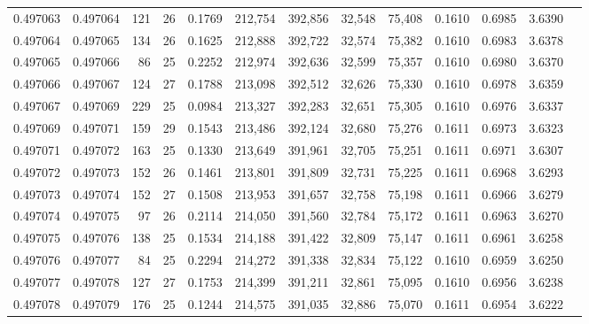 \begin{tabular}{rrrrrrrrrrrrr}
0.497063 & 0.497064 & 121 &  26 &                                     0.1769 & 212,754 & 392,856 &  32,548 &  75,408 & 0.1610 & 0.6985 & 3.6390 \\
0.497064 & 0.497065 & 134 &  26 &                                     0.1625 & 212,888 & 392,722 &  32,574 &  75,382 & 0.1610 & 0.6983 & 3.6378 \\
0.497065 & 0.497066 &  86 &  25 &                                     0.2252 & 212,974 & 392,636 &  32,599 &  75,357 & 0.1610 & 0.6980 & 3.6370 \\
0.497066 & 0.497067 & 124 &  27 &                                     0.1788 & 213,098 & 392,512 &  32,626 &  75,330 & 0.1610 & 0.6978 & 3.6359 \\
0.497067 & 0.497069 & 229 &  25 &                                     0.0984 & 213,327 & 392,283 &  32,651 &  75,305 & 0.1610 & 0.6976 & 3.6337 \\
0.497069 & 0.497071 & 159 &  29 &                                     0.1543 & 213,486 & 392,124 &  32,680 &  75,276 & 0.1611 & 0.6973 & 3.6323 \\
0.497071 & 0.497072 & 163 &  25 &                                     0.1330 & 213,649 & 391,961 &  32,705 &  75,251 & 0.1611 & 0.6971 & 3.6307 \\
0.497072 & 0.497073 & 152 &  26 &                                     0.1461 & 213,801 & 391,809 &  32,731 &  75,225 & 0.1611 & 0.6968 & 3.6293 \\
0.497073 & 0.497074 & 152 &  27 &                                     0.1508 & 213,953 & 391,657 &  32,758 &  75,198 & 0.1611 & 0.6966 & 3.6279 \\
0.497074 & 0.497075 &  97 &  26 &                                     0.2114 & 214,050 & 391,560 &  32,784 &  75,172 & 0.1611 & 0.6963 & 3.6270 \\
0.497075 & 0.497076 & 138 &  25 &                                     0.1534 & 214,188 & 391,422 &  32,809 &  75,147 & 0.1611 & 0.6961 & 3.6258 \\
0.497076 & 0.497077 &  84 &  25 &                                     0.2294 & 214,272 & 391,338 &  32,834 &  75,122 & 0.1610 & 0.6959 & 3.6250 \\
0.497077 & 0.497078 & 127 &  27 &                                     0.1753 & 214,399 & 391,211 &  32,861 &  75,095 & 0.1610 & 0.6956 & 3.6238 \\
0.497078 & 0.497079 & 176 &  25 &                                     0.1244 & 214,575 & 391,035 &  32,886 &  75,070 & 0.1611 & 0.6954 & 3.6222 \\

\end{tabular}
